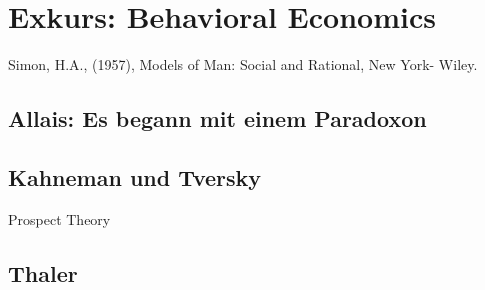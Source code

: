 %
%
%

\chapter{Exkurs: Behavioral Economics}
\label{Behavioral}

Simon, H.A., (1957), Models of Man: Social and Rational, New York- Wiley.

\section{Allais: Es begann mit einem Paradoxon}

\section{Kahneman und Tversky}
Prospect Theory

\section{Thaler}